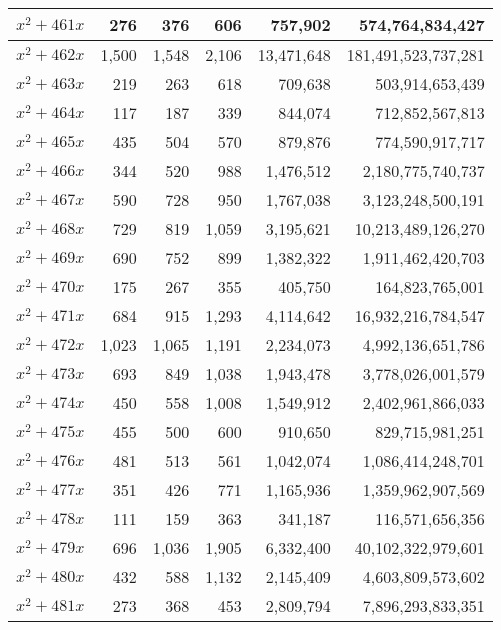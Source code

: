 \documentclass[a4paper]{amsproc}
\theoremstyle{plain}
\theoremstyle{named}
\begin{document}
\begin{longtable}{ | l | r | r | r | r | r | }
$x^2 + 461x$ & 276 & 376 & 606 & 757{,}902 & 574{,}764{,}834{,}427 \\ \hline
$x^2 + 462x$ & 1{,}500 & 1{,}548 & 2{,}106 & 13{,}471{,}648 & 181{,}491{,}523{,}737{,}281 \\ \hline
$x^2 + 463x$ & 219 & 263 & 618 & 709{,}638 & 503{,}914{,}653{,}439 \\ \hline
$x^2 + 464x$ & 117 & 187 & 339 & 844{,}074 & 712{,}852{,}567{,}813 \\ \hline
$x^2 + 465x$ & 435 & 504 & 570 & 879{,}876 & 774{,}590{,}917{,}717 \\ \hline
$x^2 + 466x$ & 344 & 520 & 988 & 1{,}476{,}512 & 2{,}180{,}775{,}740{,}737 \\ \hline
$x^2 + 467x$ & 590 & 728 & 950 & 1{,}767{,}038 & 3{,}123{,}248{,}500{,}191 \\ \hline
$x^2 + 468x$ & 729 & 819 & 1{,}059 & 3{,}195{,}621 & 10{,}213{,}489{,}126{,}270 \\ \hline
$x^2 + 469x$ & 690 & 752 & 899 & 1{,}382{,}322 & 1{,}911{,}462{,}420{,}703 \\ \hline
$x^2 + 470x$ & 175 & 267 & 355 & 405{,}750 & 164{,}823{,}765{,}001 \\ \hline
$x^2 + 471x$ & 684 & 915 & 1{,}293 & 4{,}114{,}642 & 16{,}932{,}216{,}784{,}547 \\ \hline
$x^2 + 472x$ & 1{,}023 & 1{,}065 & 1{,}191 & 2{,}234{,}073 & 4{,}992{,}136{,}651{,}786 \\ \hline
$x^2 + 473x$ & 693 & 849 & 1{,}038 & 1{,}943{,}478 & 3{,}778{,}026{,}001{,}579 \\ \hline
$x^2 + 474x$ & 450 & 558 & 1{,}008 & 1{,}549{,}912 & 2{,}402{,}961{,}866{,}033 \\ \hline
$x^2 + 475x$ & 455 & 500 & 600 & 910{,}650 & 829{,}715{,}981{,}251 \\ \hline
$x^2 + 476x$ & 481 & 513 & 561 & 1{,}042{,}074 & 1{,}086{,}414{,}248{,}701 \\ \hline
$x^2 + 477x$ & 351 & 426 & 771 & 1{,}165{,}936 & 1{,}359{,}962{,}907{,}569 \\ \hline
$x^2 + 478x$ & 111 & 159 & 363 & 341{,}187 & 116{,}571{,}656{,}356 \\ \hline
$x^2 + 479x$ & 696 & 1{,}036 & 1{,}905 & 6{,}332{,}400 & 40{,}102{,}322{,}979{,}601 \\ \hline
$x^2 + 480x$ & 432 & 588 & 1{,}132 & 2{,}145{,}409 & 4{,}603{,}809{,}573{,}602 \\ \hline
$x^2 + 481x$ & 273 & 368 & 453 & 2{,}809{,}794 & 7{,}896{,}293{,}833{,}351 \\ \hline

\end{longtable}
\end{document}
